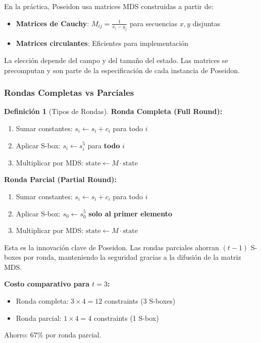 \documentclass[11pt,a4paper,twoside,openright]{book}
\theoremstyle{definition}
\newtheorem{definition}{Definición}[chapter]
\theoremstyle{plain}
\theoremstyle{remark}
\begin{document}
\begin{mathnote}
En la práctica, Poseidon usa matrices MDS construidas a partir de:
\begin{itemize}
    \item \textbf{Matrices de Cauchy}: $M_{ij} = \frac{1}{x_i - y_j}$ para secuencias $x, y$ disjuntas
    \item \textbf{Matrices circulantes}: Eficientes para implementación
\end{itemize}

La elección depende del campo y del tamaño del estado. Las matrices se precomputan y son parte de la especificación de cada instancia de Poseidon.
\end{mathnote}

\subsubsection{Rondas Completas vs Parciales}

\begin{definition}[Tipos de Rondas]
\textbf{Ronda Completa (Full Round):}
\begin{enumerate}
    \item Sumar constantes: $s_i \leftarrow s_i + c_i$ para todo $i$
    \item Aplicar S-box: $s_i \leftarrow s_i^5$ para \textbf{todo} $i$
    \item Multiplicar por MDS: $\text{state} \leftarrow M \cdot \text{state}$
\end{enumerate}

\textbf{Ronda Parcial (Partial Round):}
\begin{enumerate}
    \item Sumar constantes: $s_i \leftarrow s_i + c_i$ para todo $i$
    \item Aplicar S-box: $s_0 \leftarrow s_0^5$ \textbf{solo al primer elemento}
    \item Multiplicar por MDS: $\text{state} \leftarrow M \cdot \text{state}$
\end{enumerate}
\end{definition}

\begin{keyidea}
Esta es la innovación clave de Poseidon. Las rondas parciales ahorran $(t-1)$ S-boxes por ronda, manteniendo la seguridad gracias a la difusión de la matriz MDS.

\textbf{Costo comparativo para $t = 3$:}
\begin{itemize}
    \item Ronda completa: $3 \times 4 = 12$ constraints (3 S-boxes)
    \item Ronda parcial: $1 \times 4 = 4$ constraints (1 S-box)
\end{itemize}

Ahorro: 67\% por ronda parcial.
\end{keyidea}
\end{document}
